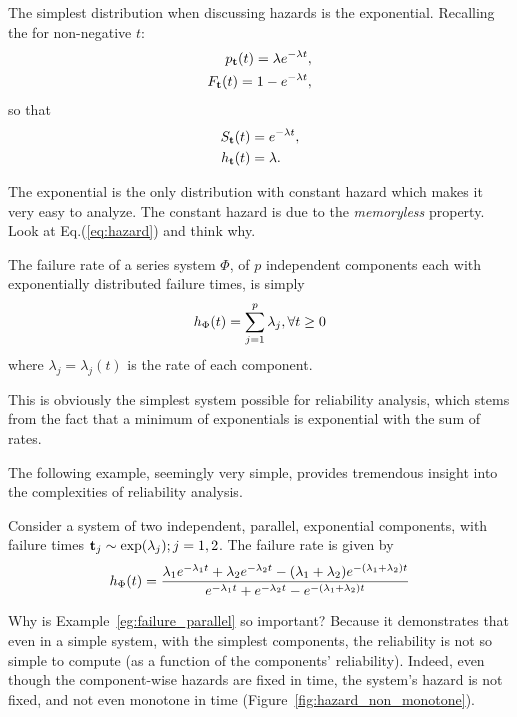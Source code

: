 \begin{example}
The simplest distribution when discussing hazards is the exponential.
Recalling the for non-negative $t$:
\begin{align}
	p_{\mathbf{t}} (t)= \lambda e^{-\lambda t}, \\
	F_{\mathbf{t}} (t)= 1-e^{-\lambda t},
\end{align}
so that 
\begin{align}
	S_{\mathbf{t}} (t) &= e^{-\lambda t}, \\
	h_{\mathbf{t}} (t) &= \lambda.
\end{align}
\end{example}
The exponential is the only distribution with constant hazard which makes it very easy to analyze.
The constant hazard is due to the \emph{memoryless} property. Look at Eq.(\ref{eq:hazard}) and think why.



\begin{example}
The failure rate of a series system $\Phi$, of $p$ independent components each with exponentially distributed failure times, is simply 
\begin{align}
	h_{\Phi} (t)= \sum_{j=1}^{p} \lambda_j, \forall t \geq 0
\end{align}
where $\lambda_j=\lambda_j(t)$ is the rate of each component.
\end{example}
This is obviously the simplest system possible for reliability analysis, which stems from the fact that a minimum of exponentials is exponential with the sum of rates.



The following example, seemingly very simple, provides tremendous insight into the complexities of reliability analysis.
\begin{example}
\label{eg:failure_parallel}
Consider a system of two independent, parallel, exponential components, with failure times $\mathbf{t}_j\sim \exp(\lambda_j); j=1,2$.
The failure rate is given by
\begin{align}
	h_{\Phi} (t)=
	\frac
	{\lambda_1 e^{-\lambda_1 t} + \lambda_2 e^{-\lambda_2 t}  - (\lambda_1+ \lambda_2) e^{-(\lambda_1+ \lambda_2) t}}
	{e^{-\lambda_1 t} + e^{-\lambda_2 t} - e^{-(\lambda_1+ \lambda_2) t}}
\end{align}
\end{example}
Why is Example~\ref{eg:failure_parallel} so important?
Because it demonstrates that even in a simple system, with the simplest components, the reliability is not so simple to compute (as a function of the components' reliability). 
Indeed, even though the component-wise hazards are fixed in time, the system's hazard is not fixed, and not even monotone in time (Figure~\ref{fig:hazard_non_monotone}). 


